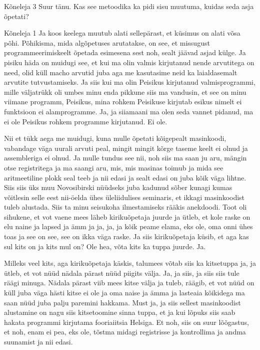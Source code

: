Kõneleja 3
Suur tänu. Kas see metoodika ka pidi sisu muutuma, kuidas seda asja õpetati? 

Kõneleja 1
Ja koos keelega muutub alati sellepärast, et küsimus on alati võsa põhi. Põhikisma, mida algõpetuses arutatakse, on see, et missugust programmeerimiskeelt õpetada esimesena sest noh, sealt jäävad asjad külge. Ja pisiku häda on muidugi see, et kui ma olin valmis kirjutanud nende arvutitega on need, olid küll macho arvutid juba aga me kasutasime neid ka laialdasemalt arvutite tutvustamiseks. Ja siis kui ma olin Peisikus kirjutanud valmisprogrammi, mille väljatrükk oli umbes minu enda pikkune siis ma vandusin, et see on minu viimane programm, Peisikus, mina rohkem Peisikuse kirjutab esikus nimelt ei funktsioon ei alamprogramme. Ja, ja siiamaani ma olen seda vannet pidanud, ma ei ole Peisikus rohkem programme kirjutanud. Ei ole. 

Nii et tükk aega me muidugi, kuna mulle õpetati kõigepealt masinkoodi, vabandage väga uurali arvuti peal, mingit mingit kõrge taseme keelt ei olnud ja assembleriga ei olnud. Ja mulle tundus see nii, noh siis ma saan ju aru, mängin otse registritega ja ma saangi aru, mis, mis masinas toimub ja mida see aritmeetiline plokk seal teeb ja nii edasi ja sealt edasi on juba kõik väga lihtne. Siis siis üks muu Novosibirski nüüdseks juba kadunud sõber kunagi kumas võitlesin selle eest nii-öelda ühes üleliidulises seminaris, et ikkagi masinkoodist tuleb alustada. Siis ta minu seisukoha ilmestamiseks rääkis anekdoodi. Toot oli sihukene, et vot vaene mees läheb kirikuõpetaja juurde ja ütleb, et kole raske on elu naine ja lapsed ja ämm ja ja, ja, ja kõik peame elama, eks ole, oma onni ühes toas ja see on see, see on ikka väga raske. Ja siis kirikuõpetaja küsib, et aga kas sul kits on ja kits mul on? Ole hea, võta kits ka tuppa juurde. Ja. 

Milleks veel kits, aga kirikuõpetaja käskis, talumees võtab siis ka kitsetuppa ja, ja ütleb, et vot nüüd nädala pärast nüüd piigits välja. Ja, ja siis, ja siis siis tule räägi minuga. Nädala pärast viib mees kitse välja ja tuleb, räägib, et vot nüüd on küll juba väga hästi kitse ei ole ja oma naise ja ämma ja lasteaia kõikidega ma saan nüüd juba palju paremini hakkama. Must ja, ja siis sellest masinkoodist alustamine on nagu siis kitsetoomine sinna tuppa, et ja kui lõpuks siis saab hakata programmi kirjutama fooriaiitsia Helsiga. Et noh, siis on suur lõõgastus, et noh, enam ei pea, eks ole, tõstma midagi registrisse ja kontrollima ja andma suunamist ja nii edasi. 

